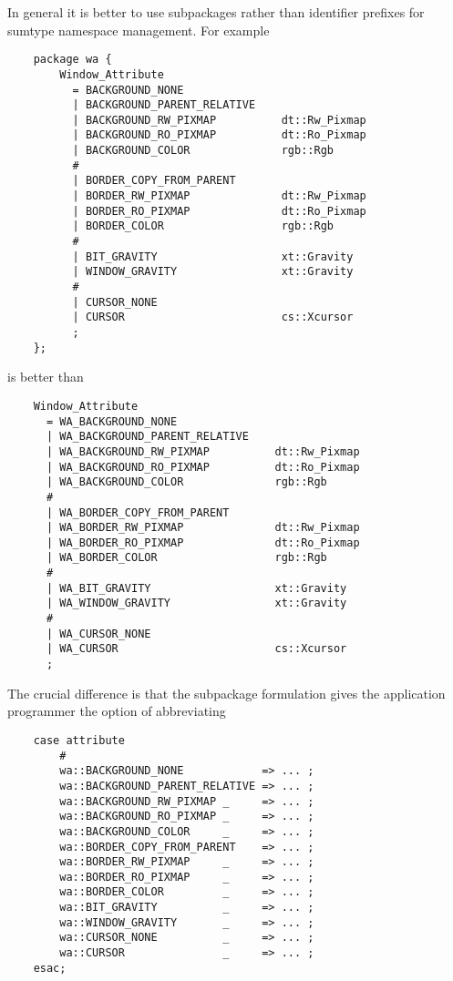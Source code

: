 In general it is better to use subpackages rather than identifier prefixes 
for sumtype namespace management.  For example

\begin{verbatim}
    package wa {
        Window_Attribute
          = BACKGROUND_NONE
          | BACKGROUND_PARENT_RELATIVE
          | BACKGROUND_RW_PIXMAP          dt::Rw_Pixmap
          | BACKGROUND_RO_PIXMAP          dt::Ro_Pixmap
          | BACKGROUND_COLOR              rgb::Rgb
          #
          | BORDER_COPY_FROM_PARENT
          | BORDER_RW_PIXMAP              dt::Rw_Pixmap
          | BORDER_RO_PIXMAP              dt::Ro_Pixmap
          | BORDER_COLOR                  rgb::Rgb
          #
          | BIT_GRAVITY                   xt::Gravity
          | WINDOW_GRAVITY                xt::Gravity
          #
          | CURSOR_NONE
          | CURSOR                        cs::Xcursor
          ;
    };
\end{verbatim}

is better than

\begin{verbatim}
    Window_Attribute
      = WA_BACKGROUND_NONE
      | WA_BACKGROUND_PARENT_RELATIVE
      | WA_BACKGROUND_RW_PIXMAP          dt::Rw_Pixmap
      | WA_BACKGROUND_RO_PIXMAP          dt::Ro_Pixmap
      | WA_BACKGROUND_COLOR              rgb::Rgb
      #
      | WA_BORDER_COPY_FROM_PARENT
      | WA_BORDER_RW_PIXMAP              dt::Rw_Pixmap
      | WA_BORDER_RO_PIXMAP              dt::Ro_Pixmap
      | WA_BORDER_COLOR                  rgb::Rgb
      #
      | WA_BIT_GRAVITY                   xt::Gravity
      | WA_WINDOW_GRAVITY                xt::Gravity
      #
      | WA_CURSOR_NONE
      | WA_CURSOR                        cs::Xcursor
      ;
\end{verbatim}

The crucial difference is that the subpackage formulation gives 
the application programmer the option of abbreviating

\begin{verbatim}
    case attribute
        #
        wa::BACKGROUND_NONE            => ... ;
        wa::BACKGROUND_PARENT_RELATIVE => ... ;
        wa::BACKGROUND_RW_PIXMAP _     => ... ;
        wa::BACKGROUND_RO_PIXMAP _     => ... ;
        wa::BACKGROUND_COLOR     _     => ... ;
        wa::BORDER_COPY_FROM_PARENT    => ... ;
        wa::BORDER_RW_PIXMAP     _     => ... ;
        wa::BORDER_RO_PIXMAP     _     => ... ;
        wa::BORDER_COLOR         _     => ... ;
        wa::BIT_GRAVITY          _     => ... ; 
        wa::WINDOW_GRAVITY       _     => ... ;
        wa::CURSOR_NONE          _     => ... ;
        wa::CURSOR               _     => ... ;
    esac;
\end{verbatim}

